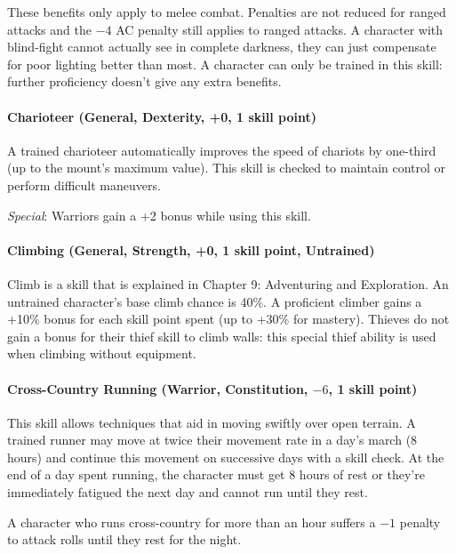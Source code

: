 \begin{multicols}{2}
These benefits only apply to melee combat.  Penalties are not reduced for ranged attacks and the $-4$ AC penalty still applies to ranged attacks.  A character with blind-fight cannot actually see in complete darkness, they can just compensate for poor lighting better than most.  A character can only be trained in this skill: further proficiency doesn't give any extra benefits.

\paragraph{Charioteer (General, Dexterity, +0, 1 skill point)}

A trained charioteer automatically improves the speed of chariots by one-third (up to the mount's maximum value).  This skill is checked to maintain control or perform difficult maneuvers.

\textit{Special}: Warriors gain a +2 bonus while using this skill.

\paragraph{Climbing (General, Strength, +0, 1 skill point, Untrained)}

Climb is a skill that is explained in Chapter 9: Adventuring and Exploration.  An untrained character's base climb chance is 40\%.  A proficient climber gains a +10\% bonus for each skill point spent (up to +30\% for mastery).  Thieves do not gain a bonus for their thief skill to climb walls: this special thief ability is used when climbing without equipment.

\paragraph{Cross-Country Running (Warrior, Constitution, $-6$, 1 skill point)}

This skill allows techniques that aid in moving swiftly over open terrain.  A trained runner may move at twice their movement rate in a day's march (8 hours) and continue this movement on successive days with a skill check.  At the end of a day spent running, the character must get 8 hours of rest or they're immediately fatigued the next day and cannot run until they rest.  

A character who runs cross-country for more than an hour suffers a $-1$ penalty to attack rolls until they rest for the night.


\end{multicols}
